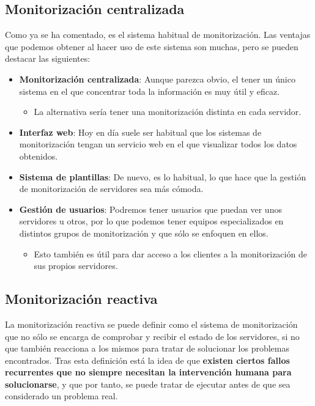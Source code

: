 \subsection{Monitorización centralizada}
Como ya se ha comentado, es el sistema habitual de monitorización. Las ventajas que podemos obtener al hacer uso de este sistema son muchas, pero se pueden destacar las siguientes:
\begin{itemize}
    \item \textbf{Monitorización centralizada}: Aunque parezca obvio, el tener un único sistema en el que concentrar toda la información es muy útil y eficaz.
    \begin{itemize}
        \item La alternativa sería tener una monitorización distinta en cada servidor.
    \end{itemize}
    \item \textbf{Interfaz web}: Hoy en día suele ser habitual que los sistemas de monitorización tengan un servicio web en el que visualizar todos los datos obtenidos.
    \item \textbf{Sistema de plantillas}: De nuevo, es lo habitual, lo que hace que la gestión de monitorización de servidores sea más cómoda.
    \item \textbf{Gestión de usuarios}: Podremos tener usuarios que puedan ver unos servidores u otros, por lo que podemos tener equipos especializados en distintos grupos de monitorización y que sólo se enfoquen en ellos.
    \begin{itemize}
        \item Esto también es útil para dar acceso a los clientes a la monitorización de sus propios servidores.
    \end{itemize}
\end{itemize}

\subsection{Monitorización reactiva}
La monitorización reactiva se puede definir como el sistema de monitorización que no sólo se encarga de comprobar y recibir el estado de los servidores, si no que también reacciona a los mismos para tratar de solucionar los problemas encontrados. Tras esta definición está la idea de que \textbf{existen ciertos fallos recurrentes que no siempre necesitan la intervención humana para solucionarse}, y que por tanto, se puede tratar de ejecutar antes de que sea considerado un problema real.

